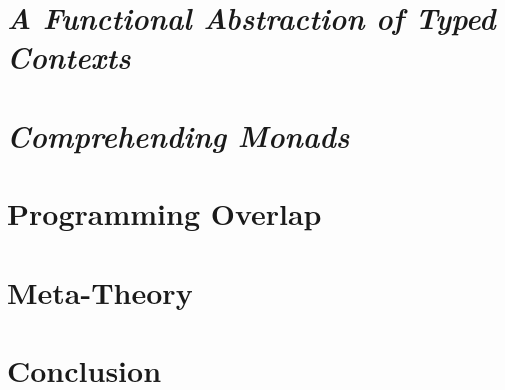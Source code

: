 \documentclass[acmsmall, nonacm]{acmart}
\begin{document}
\section{{\em A Functional Abstraction of Typed Contexts}} \label{sec:danvy}

\section{{\em Comprehending Monads}} \label{sec:wadler}

\section{Programming Overlap} \label{sec:programming}

\section{Meta-Theory} \label{sec:metatheory}

\section{Conclusion} \label{sec:conclusion}

\begin{acks}
\end{acks}



\end{document}
